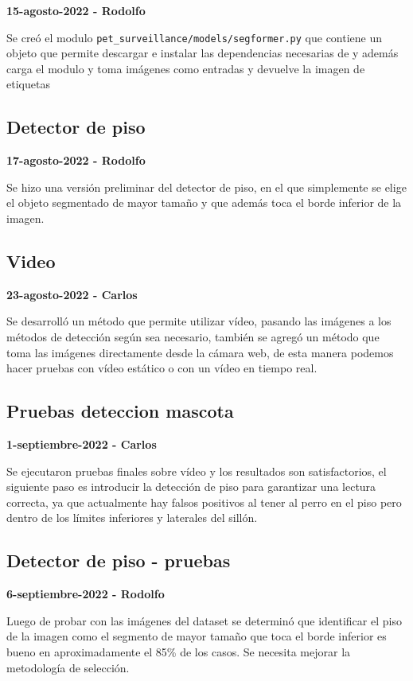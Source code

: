 \textbf{15-agosto-2022 - Rodolfo}

Se creó el modulo \texttt{pet\_surveillance/models/segformer.py} que contiene un objeto que permite descargar e instalar las dependencias necesarias de \textcite{aung2022} y además carga el modulo y toma imágenes como entradas y devuelve la imagen de etiquetas


\subsection*{Detector de piso}

\textbf{17-agosto-2022 - Rodolfo}

Se hizo una versión preliminar del detector de piso, en el que simplemente se elige el objeto segmentado de mayor tamaño y que además toca el borde inferior de la imagen.

\subsection*{Video}

\textbf{23-agosto-2022 - Carlos}

Se desarrolló un método que permite utilizar vídeo, pasando las imágenes a los métodos de detección según sea necesario, también se agregó un método que toma las imágenes
directamente desde la cámara web, de esta manera podemos hacer pruebas con vídeo estático o con un vídeo en tiempo real.

\subsection*{Pruebas deteccion mascota}

\textbf{1-septiembre-2022 - Carlos}

Se ejecutaron pruebas finales sobre vídeo y los resultados son satisfactorios, el siguiente paso es introducir la detección de piso para garantizar una lectura correcta, ya que
actualmente hay falsos positivos al tener al perro en el piso pero dentro de los límites inferiores y laterales del sillón.

\subsection*{Detector de piso - pruebas}

\textbf{6-septiembre-2022 - Rodolfo}

Luego de probar con las imágenes del dataset se determinó que identificar el piso de la imagen como el segmento de mayor tamaño que toca el borde inferior es bueno en aproximadamente el 85\% de los casos. Se necesita mejorar la metodología de selección.

